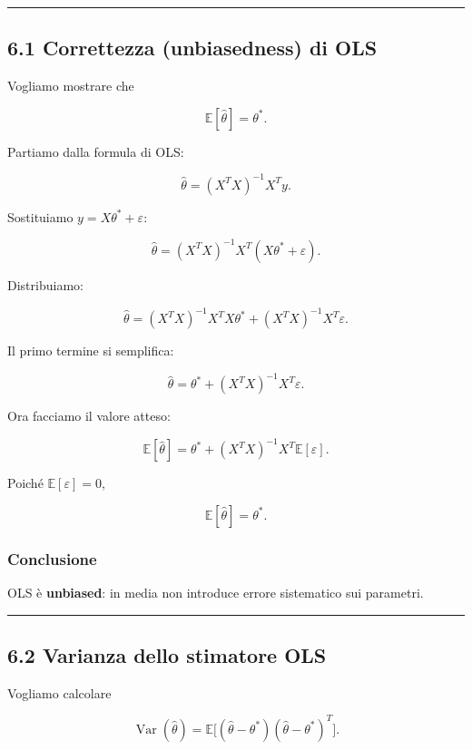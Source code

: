 \documentclass{article}
\begin{document}
\begin{center}\rule{0.5\linewidth}{0.5pt}\end{center}

\subsection{6.1 Correttezza (unbiasedness) di
OLS}\label{correttezza-unbiasedness-di-ols}

Vogliamo mostrare che

\[
\mathbb{E}[\hat\theta]=\theta^*.
\]

Partiamo dalla formula di OLS:

\[
\hat\theta=(X^TX)^{-1}X^Ty.
\]

Sostituiamo \(y=X\theta^*+\varepsilon\):

\[
\hat\theta=(X^TX)^{-1}X^T(X\theta^*+\varepsilon).
\]

Distribuiamo:

\[
\hat\theta=(X^TX)^{-1}X^TX\theta^* + (X^TX)^{-1}X^T\varepsilon.
\]

Il primo termine si semplifica:

\[
\hat\theta=\theta^* + (X^TX)^{-1}X^T\varepsilon.
\]

Ora facciamo il valore atteso:

\[
\mathbb{E}[\hat\theta]
=
\theta^* + (X^TX)^{-1}X^T\mathbb{E}[\varepsilon].
\]

Poiché \(\mathbb{E}[\varepsilon]=0\),

\[
\mathbb{E}[\hat\theta]=\theta^*.
\]

\subsubsection{Conclusione}\label{conclusione-4}

OLS è \textbf{unbiased}: in media non introduce errore sistematico sui
parametri.

\begin{center}\rule{0.5\linewidth}{0.5pt}\end{center}

\subsection{6.2 Varianza dello stimatore
OLS}\label{varianza-dello-stimatore-ols}

Vogliamo calcolare

\[
\operatorname{Var}(\hat\theta)
=
\mathbb{E}\big[(\hat\theta-\theta^*)(\hat\theta-\theta^*)^T\big].
\]
\end{document}
